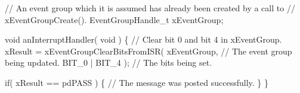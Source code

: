 \begin{DoxyPre}  // An event group which it is assumed has already been created by a call to
  // xEventGroupCreate().
  EventGroupHandle\_t xEventGroup;\end{DoxyPre}



\begin{DoxyPre}  void anInterruptHandler( void )
  \{
    // Clear bit 0 and bit 4 in xEventGroup.
    xResult = xEventGroupClearBitsFromISR(
                        xEventGroup,     // The event group being updated.
                        BIT\_0 | BIT\_4 ); // The bits being set.\end{DoxyPre}



\begin{DoxyPre}    if( xResult == pdPASS )
    \{
        // The message was posted successfully.
    \}
 \}
  \end{DoxyPre}
 